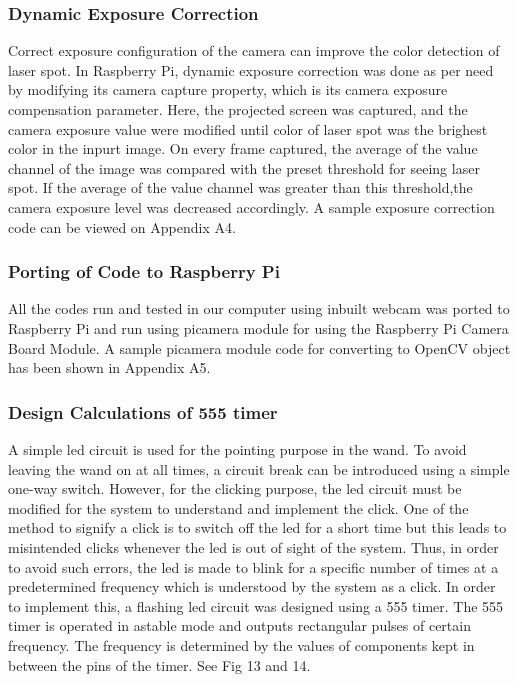 \documentclass[12pt, a4paper]{article}
\begin{document}
\subsubsection{Dynamic Exposure Correction}
	Correct exposure configuration of the camera can improve the color detection of laser spot. In Raspberry Pi, dynamic exposure correction was done as per need by modifying its camera capture property, which is its camera exposure compensation parameter. Here, the projected screen was captured, and the camera exposure value were modified until color of laser spot was the brighest color in the inpurt image. On every frame captured, the average of the value channel of the image was compared with the preset threshold for seeing laser spot. If the average of the value channel was greater than this threshold,the camera exposure level was decreased accordingly. A sample exposure correction code can be viewed on Appendix A4.

\subsubsection{Porting of Code to Raspberry Pi}
	All the codes run and tested in our computer using inbuilt webcam was ported to Raspberry Pi and run using picamera module for using the Raspberry Pi Camera Board Module. A sample picamera module code for converting to OpenCV object has been shown in Appendix A5.

\subsubsection{Design Calculations of 555 timer}

	A simple led circuit is used for the pointing purpose in the wand. To avoid leaving the wand on at all times, a circuit break can be introduced using a simple one-way switch. However, for the clicking purpose, the led circuit must be modified for the system to understand and implement the click. 
	One of the method to signify a click is to switch off the led for a short time but this leads to misintended clicks whenever the led is out of sight of the system. Thus, in order to avoid such errors, the led is made to blink for a specific number of times at a predetermined frequency which is understood by the system as a click. In order to implement this, a flashing led circuit was designed using a 555 timer. 
	The 555 timer is operated in astable mode and outputs rectangular pulses of certain frequency. The frequency is determined by the values of components kept in between the pins of the timer. See Fig 13 and 14.
\end{document}
